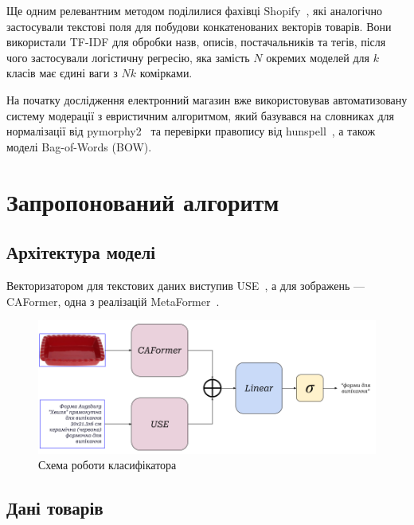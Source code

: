 \documentclass[fleqn,12pt,a4paper]{report}
\numberwithin{equation}{chapter}
\numberwithin{figure}{chapter}
\numberwithin{table}{chapter}
\numberwithin{footnote}{chapter}
\numberwithin{figure}{section}
\begin{document}
    Ще одним релевантним методом поділилися фахівці Shopify~\cite{shopify2020}, які аналогічно застосували текстові
    поля для побудови конкатенованих векторів товарів.
    Вони використали TF-IDF для обробки назв, описів, постачальників та тегів, після чого застосували логістичну
    регресію, яка замість $N$ окремих моделей для $k$ класів має єдині ваги з $Nk$ комірками.

    На початку дослідження електронний магазин вже використовував автоматизовану систему модерації з евристичним
    алгоритмом, який базувався на словниках для нормалізації від pymorphy2~\cite{pymorphy2} та перевірки правопису від
    hunspell~\cite{hunspell}, а також моделі Bag-of-Words (BOW).

    \newpage


    \chapter{Запропонований алгоритм}\label{ch:chaper1}


    \section{Архітектура моделі}\label{sec:section1.1}

    Векторизатором для текстових даних виступив USE~\cite{yang-etal-2020-multilingual}, а для зображень --- \\
    CAFormer, одна з реалізацій MetaFormer~\cite{10304335}.

    \noindent
    \begin{figure}[ht]
        \includegraphics[width=\textwidth]{images/catify-concatenated-model}
        \caption{Схема роботи класифікатора}
    \end{figure}

    \newpage


    \section{Дані товарів}\label{sec:section1.2}
\end{document}
